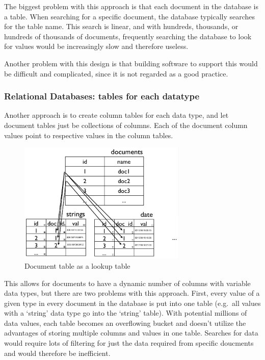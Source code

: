 The biggest problem with this approach is that each document
in the database is a table. When searching for a specific document, the database 
typically searches for the table name. This search is linear, and with hundreds,
thousands, or hundreds of thousands of documents, frequently searching the database
to look for values would be increasingly slow and therefore useless.

Another problem with this design is that building software to support this would
be difficult and complicated, since it is not regarded as a good practice.


\subsubsection{Relational Databases: tables for each datatype}
Another approach is to create column tables for each data type, and let document 
tables just be collections of columns. Each of the document column values point to 
respective values in the column tables.

\begin{figure}[h]
	\begin{center}
	\includegraphics[width=80mm]{images/rel_db_lookup}
	\caption{Document table as a lookup table} 
	\label{rel_db_lookup}
	\end{center}
\end{figure}

This allows for documents to have a dynamic number of columns with variable data types,
but there are two problems with this approach. First, every value of a given type in every document
in the database is put into one table (e.g.\ all values with a `string' data type
go into the `string' table). With potential millions of data values, each table
becomes an overflowing bucket and doesn't utilize the advantages of storing multiple
columns and values in one table. Searches for data would require lots of filtering 
for just the data required from specific doucments and would therefore be inefficient.

